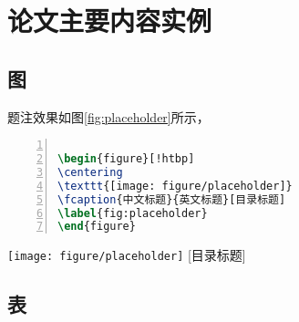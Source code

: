 
\chapter{论文主要内容实例}



\section{图}

题注效果如图\ref{fig:placeholder}所示，

\begin{lstlisting}[language=tex, label=lst:helloworld, caption=Helloworld, numbers=left, basicstyle=\ttfamily]

\begin{figure}[!htbp]
\centering
\texttt{[image: figure/placeholder]}
\fcaption{中文标题}{英文标题}[目录标题]
\label{fig:placeholder}
\end{figure}

\end{lstlisting}


\begin{figure*}[!htbp]
	\centering
	\texttt{[image: figure/placeholder]}
	[目录标题]
	\label{fig:placeholder}
\end{figure*}

\section{表}


